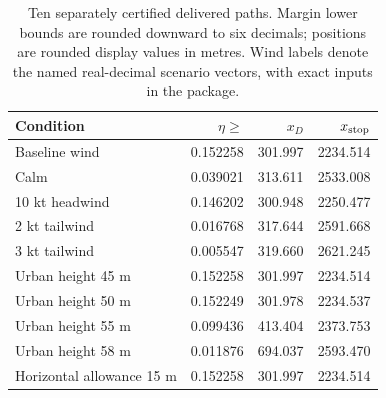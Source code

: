 \begin{table}[htbp]\centering\caption{Ten separately certified delivered paths. Margin lower bounds are rounded downward to six decimals; positions are rounded display values in metres. Wind labels denote the named real-decimal scenario vectors, with exact inputs in the package.}\label{tab:conditions}
\begin{tabular}{lrrr}\toprule
Condition & $\eta\geq$ & $x_D$ & $x_{\rm stop}$\\\midrule
Baseline wind & 0.152258 & 301.997 & 2234.514\\
Calm & 0.039021 & 313.611 & 2533.008\\
10 kt headwind & 0.146202 & 300.948 & 2250.477\\
2 kt tailwind & 0.016768 & 317.644 & 2591.668\\
3 kt tailwind & 0.005547 & 319.660 & 2621.245\\
Urban height 45 m & 0.152258 & 301.997 & 2234.514\\
Urban height 50 m & 0.152249 & 301.978 & 2234.537\\
Urban height 55 m & 0.099436 & 413.404 & 2373.753\\
Urban height 58 m & 0.011876 & 694.037 & 2593.470\\
Horizontal allowance 15 m & 0.152258 & 301.997 & 2234.514\\
\bottomrule\end{tabular}\end{table}
